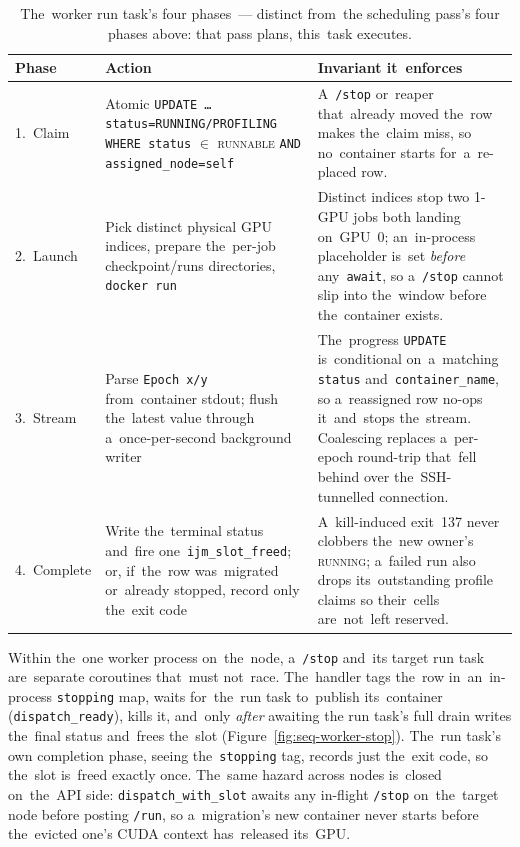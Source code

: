 \begin{table}[H]
\centering\small
\begin{tabularx}{\textwidth}{@{}l >{\raggedright\arraybackslash}X >{\raggedright\arraybackslash}X@{}}
\toprule
\textbf{Phase} & \textbf{Action} & \textbf{Invariant it~enforces} \\
\midrule
1.~Claim    & Atomic \texttt{UPDATE \ldots status=RUNNING/PROFILING WHERE status} $\in$ \textsc{runnable} \texttt{AND assigned\_node=self} & A~\texttt{/stop} or~reaper that~already moved the~row makes the~claim miss, so no~container starts for~a~re-placed row. \\
2.~Launch   & Pick distinct physical GPU indices, prepare the~per-job checkpoint/runs directories, \texttt{docker run} & Distinct indices stop two 1-GPU jobs both landing on~GPU~0; an~in-process placeholder is~set \emph{before} any~\texttt{await}, so a~\texttt{/stop} cannot slip into the~window before the~container exists. \\
3.~Stream   & Parse \texttt{Epoch x/y} from~container stdout; flush the~latest value through a~once-per-second background writer & The~progress \texttt{UPDATE} is~conditional on~a~matching \texttt{status} and~\texttt{container\_name}, so a~reassigned row no-ops it~and~stops the~stream.  Coalescing replaces a~per-epoch round-trip that~fell behind over the~SSH-tunnelled connection. \\
4.~Complete & Write the~terminal status and~fire one~\texttt{ijm\_slot\_freed}; or, if~the~row was~migrated or~already stopped, record only the~exit code & A~kill-induced exit~137 never clobbers the~new owner's \textsc{running}; a~failed run also drops its~outstanding profile claims so their~cells are~not~left reserved. \\
\bottomrule
\end{tabularx}
\caption{The~worker run task's four phases~--- distinct from~the
scheduling pass's four phases above: that pass plans, this~task
executes.}\label{tab:worker-phases}
\end{table}

Within the~one worker process on~the~node, a~\texttt{/stop} and~its target run
task are~separate coroutines that~must not~race.  The~handler tags the~row
in~an~in-process \texttt{stopping}
map, waits for~the~run task to~publish its~container
(\texttt{dispatch\_ready}), kills it, and~only \emph{after} awaiting the
run task's full drain writes the~final status and~frees the~slot
(Figure~\ref{fig:seq-worker-stop}).  The~run task's own completion phase,
seeing the~\texttt{stopping} tag, records just the~exit code, so the~slot
is~freed exactly once.  The~same hazard across nodes is~closed on~the~API
side: \texttt{dispatch\_with\_slot} awaits any in-flight \texttt{/stop}
on~the~target node before posting \texttt{/run}, so a~migration's new
container never starts before the~evicted one's CUDA context has~released
its~GPU.

